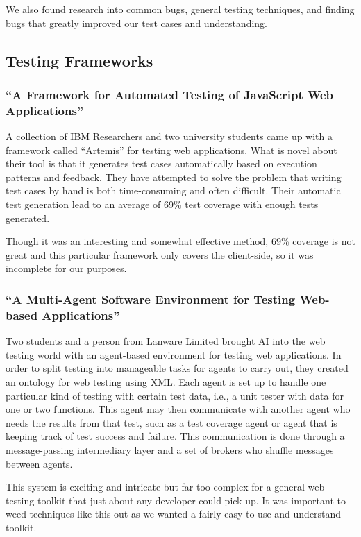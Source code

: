 \documentclass[11pt]{article}
\begin{document}
We also found research into common bugs, general testing techniques, and finding bugs that greatly improved our test cases and understanding.

\subsection{Testing Frameworks}

\subsubsection{``A Framework for Automated Testing of JavaScript Web Applications'' \cite{FrameworkForAutomatedTesting}}
A collection of IBM Researchers and two university students came up with a framework called ``Artemis'' for testing web applications. What is novel about their tool is that it generates test cases automatically based on execution patterns and feedback. They have attempted to solve the problem that writing test cases by hand is both time-consuming and often difficult. Their automatic test generation lead to an average of 69\% test coverage with enough tests generated.

Though it was an interesting and somewhat effective method, 69\% coverage is not great and this particular framework only covers the client-side, so it was incomplete for our purposes.

\subsubsection{``A Multi-Agent Software Environment for Testing Web-based Applications'' \cite{MultiAgentSoftwareEnvironment}}
Two students and a person from Lanware Limited brought AI into the web testing world with an agent-based environment for testing web applications. In order to split testing into manageable tasks for agents to carry out, they created an ontology for web testing using XML. Each agent is set up to handle one particular kind of testing with certain test data, i.e., a unit tester with data for one or two functions. This agent may then communicate with another agent who needs the results from that test, such as a test coverage agent or agent that is keeping track of test success and failure. This communication is done through a message-passing intermediary layer and a set of brokers who shuffle messages between agents.

This system is exciting and intricate but far too complex for a general web testing toolkit that just about any developer could pick up. It was important to weed techniques like this out as we wanted a fairly easy to use and understand toolkit.
\end{document}

